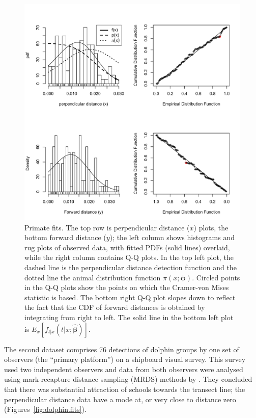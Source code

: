 \documentclass[useAMS,usenatbib,referee]{biom}
\begin{document}
\begin{figure}
\caption{Primate fits. The top row is perpendicular distance ($x$) plots, the bottom forward distance ($y$); the left column shows histograms and rug plots of observed data, with fitted PDFs (solid lines) overlaid, while the right column contains Q-Q plots. In the top left plot, the dashed line is the perpendicular distance detection function and the dotted line the animal distribution function $\pi(x;\boldsymbol{\phi})$. Circled points in the Q-Q plots show the points on which the Cramer-von Mises statistic is based. The bottom right Q-Q plot slopes down to reflect the fact that the CDF of forward distances is obtained by integrating from right to left. The solid line in the bottom left plot is $E_x[f_{t|x}(t|x;\hat{\boldsymbol{\beta}})]$.\label{fig:primate.fits}}
\includegraphics[scale=0.6]{PrimateFits.pdf}
\end{figure}

The second dataset comprises 76 detections  of dolphin groups by one set of observers (the ``primary platform'') on a shipboard visual survey. This survey used two independent observers and data from both observers were analysed using mark-recapture distance sampling (MRDS) methods \cite[see][for an overview of these methods]{Burt+al:15} by \cite{Canadas+al:04}. They concluded that there was substantial attraction of schools towards the transect line; the perpendicular distance data have a mode at, or very close to distance zero (Figures~\ref{fig:dolphin.fits}).
\end{document}
